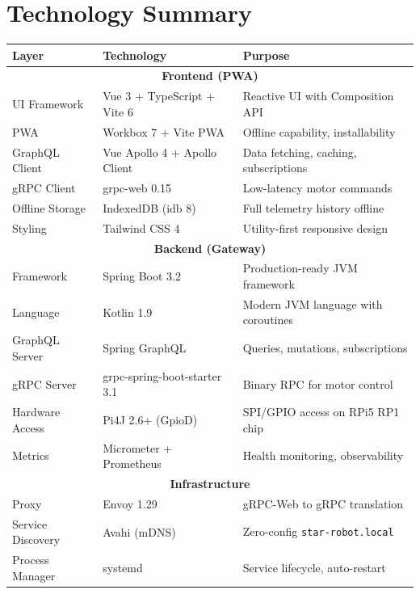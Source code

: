 \documentclass[11pt,letterpaper]{article}
\begin{document}
\section{Technology Summary}

\begin{table}[H]
\centering
\small
\begin{tabularx}{\textwidth}{|l|l|X|}
\hline
\textbf{Layer} & \textbf{Technology} & \textbf{Purpose} \\
\hline
\multicolumn{3}{|c|}{\textbf{Frontend (PWA)}} \\
\hline
UI Framework & Vue 3 + TypeScript + Vite 6 & Reactive UI with Composition API \\
PWA & Workbox 7 + Vite PWA & Offline capability, installability \\
GraphQL Client & Vue Apollo 4 + Apollo Client & Data fetching, caching, subscriptions \\
gRPC Client & grpc-web 0.15 & Low-latency motor commands \\
Offline Storage & IndexedDB (idb 8) & Full telemetry history offline \\
Styling & Tailwind CSS 4 & Utility-first responsive design \\
\hline
\multicolumn{3}{|c|}{\textbf{Backend (Gateway)}} \\
\hline
Framework & Spring Boot 3.2 & Production-ready JVM framework \\
Language & Kotlin 1.9 & Modern JVM language with coroutines \\
GraphQL Server & Spring GraphQL & Queries, mutations, subscriptions \\
gRPC Server & grpc-spring-boot-starter 3.1 & Binary RPC for motor control \\
Hardware Access & Pi4J 2.6+ (GpioD) & SPI/GPIO access on RPi5 RP1 chip \\
Metrics & Micrometer + Prometheus & Health monitoring, observability \\
\hline
\multicolumn{3}{|c|}{\textbf{Infrastructure}} \\
\hline
Proxy & Envoy 1.29 & gRPC-Web to gRPC translation \\
Service Discovery & Avahi (mDNS) & Zero-config \texttt{star-robot.local} \\
Process Manager & systemd & Service lifecycle, auto-restart \\

\end{tabularx}
\end{table}
\end{document}
